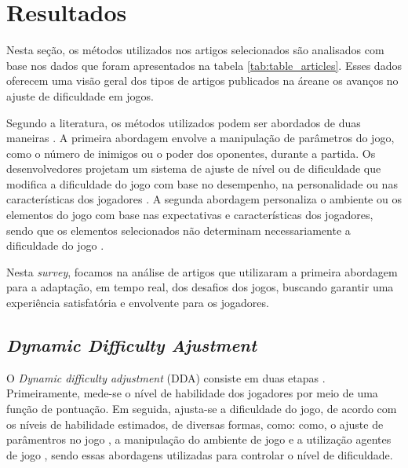 \section{Resultados} \label{sec:results}
    Nesta seção, os métodos utilizados nos artigos
    selecionados são analisados com base nos dados que
    foram apresentados na tabela \ref{tab:table_articles}.
    Esses dados oferecem uma visão geral dos tipos de 
    artigos publicados na áreane os avanços no ajuste de
    dificuldade em jogos.

    Segundo a literatura, os métodos utilizados podem 
    ser abordados de duas maneiras 
    \cite{lopes2011adaptivity}.
    A primeira abordagem envolve a manipulação de parâmetros 
    do jogo, como o número de inimigos ou o poder dos 
    oponentes, durante a partida. Os desenvolvedores 
    projetam um sistema de ajuste de nível ou de dificuldade
    que modifica a dificuldade do jogo com base no 
    desempenho, na personalidade ou nas características dos 
    jogadores \cite{lara2018induction}.
    A segunda abordagem personaliza o ambiente ou os 
    elementos do jogo com base nas expectativas e 
    características dos jogadores, sendo que os elementos 
    selecionados não determinam necessariamente a 
    dificuldade do jogo \cite{lavoue2018adaptive}.

    Nesta \textit{survey}, focamos na análise de artigos 
    que utilizaram a primeira abordagem para a adaptação,
    em tempo real, dos desafios dos jogos, buscando 
    garantir uma experiência satisfatória e envolvente 
    para os jogadores.

    


\subsection{\textit{Dynamic Difficulty Ajustment}}
    O \textit{Dynamic difficulty adjustment} (DDA) 
    consiste em duas etapas \cite{zohaib2018dynamic}.
    Primeiramente, mede-se o nível de habilidade dos 
    jogadores por meio de uma função de pontuação. 
    Em seguida, ajusta-se a dificuldade do jogo, de 
    acordo com os níveis de habilidade estimados, de 
    diversas formas, como: \cite{moon2022diversifying} 
    como, o ajuste de parâmentros no jogo
    \cite{denisova2015adaptation},
    a manipulação do ambiente de jogo
    \cite{duque2020finding,lora2016dynamic} 
    e a utilização agentes de jogo
    \cite{demediuk2017monte,ishihara2018monte}, sendo
    essas abordagens utilizadas para controlar o nível
    de dificuldade.
    

